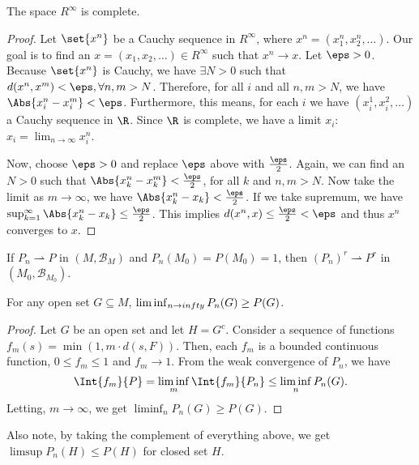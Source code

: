 \documentclass[12pt,letterpaper,twoside]{hmcpset}
\begin{document}
\begin{problem}
  The space $R^\infty$ is complete.
\end{problem}

\begin{solution}
  \begin{proof}
    Let $\set{x^n}$ be a Cauchy sequence in $R^\infty$, where $x^n = (x_1^n, x_2^n, \dotsc)$.
    Our goal is to find an $x = (x_1, x_2, \dotsc) \in R^\infty$ such that $x^n \to x$.
    Let $\eps > 0$.
    Because $\set{x^n}$ is Cauchy, we have $\exists N > 0$ such that $d(x^n,x^m) < \eps, \forall n,m > N$.
    Therefore, for all $i$ and all $n,m > N$, we have $\Abs{x^n_i - x^m_i} < \eps$.
    Furthermore, this means, for each $i$ we have $(x^1_i, x^2_i, \dotsc)$ a Cauchy sequence in $\R$.
    Since $\R$ is complete, we have a limit $x_i$: $x_i = \lim_{n\to\infty}x^n_i$.
    
    Now, choose $\eps > 0$ and replace $\eps$ above with $\frac{\eps}{2}$.
    Again, we can find an $N > 0$ such that $\Abs{x_k^n - x_k^m} < \frac{\eps}{2}$, for all $k$ and $n,m > N$.
    Now take the limit as $m \to \infty$, we have $\Abs{x_k^n - x_k} < \frac{\eps}{2}$.
    If we take supremum, we have $\sup_{k=1}^\infty\Abs{x_k^n - x_k} \leq \frac{\eps}{2}$.
    This implies $d(x^n, x) \leq \frac{\eps}{2} < \eps$ and thus $x^n$ converges to $x$.
    
  \end{proof}
\end{solution}

\begin{problem}
  If $P_n \rightharpoonup P$ in $(M, \mathcal{B}_M)$ and $P_n(M_0) = P(M_0) = 1$, then $(P_n)^r \rightharpoonup P^r$ in $(M_0, \mathcal{B}_{M_0})$.
\end{problem}

\begin{solution}
  \begin{lem}
    \label{lem:1}
    For any open set $G \subseteq M$, $\liminf_{n\to\\infty}P_n(G) \geq P(G)$.
  \end{lem}
  \begin{proof}
    Let $G$ be an open set and let $H = G^c$.
    Consider a sequence of functions $f_m(s) = \min(1,m\cdot d(s,F))$.
    Then, each $f_m$ is a bounded continuous function, $0 \leq f_m \leq 1$ and $f_m \to 1$.
    From the weak convergence of $P_n$, we have \[
    \Int{f_m}{P} = \liminf_m \Int{f_m}{P_n} \leq \liminf_n P_n(G).
    \]
    Letting, $m\to\infty$, we get $\liminf_n P_n(G) \geq P(G)$.
  \end{proof}
  Also note, by taking the complement of everything above, we get $\limsup P_n(H) \leq P(H)$ for closed set $H$.
\end{solution}
\end{document}
